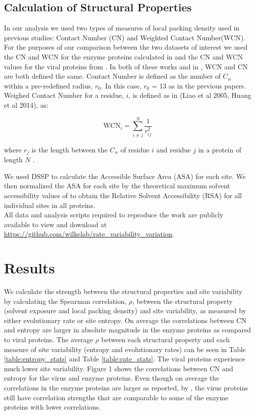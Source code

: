 \documentclass[12pt]{article}
\begin{document}
    \subsection*{Calculation of Structural Properties}
In our analysis we used two types of measures of local packing density used in previous studies: Contact Number (CN) and Weighted Contact Number(WCN). For the purposes of our comparison between the two datasets of interest we used the CN and WCN for the enzyme proteins calculated in \cite{Huangetal2014} and the CN and WCN values for the viral proteins from \cite{Shahmoradietal2014}. In both of these works and in \cite{Yehetal2014}, WCN and CN are both defined the same.  Contact Number is defined as the number of $C_{\alpha}$ within a pre-redefined radius, $r_0$. In this case, $r_0$ = 13 as in the previous papers. Weighed Contact Number for a residue, $i$, is defined as in (Liao et al 2005, Huang et al 2014), as:
	
	\begin{equation} \label{wcn_eqn}
		\text{WCN}_i = \sum_{i \neq j}^{N} \frac{1}{r_{ij}^2 } 
	\end{equation}
	
	where $r_j$ is the length between the $C_{\alpha}$ of residue $i$ and residue $j$ in a protein of length $N$ \citep{Yehetal2014}. 

\indent We used DSSP \citep{Kabschetal2005} to calculate the Accessible Surface Area (ASA) for each site. We then normalized the ASA for each site by the theoretical maximum solvent accessibility values of \cite{Tienetal2013} to obtain the Relative Solvent Accessibility (RSA) for all individual sites in all proteins. \\

All data and analysis scripts required to reproduce the work are publicly available to view and download at \url{https://github.com/wilkelab/rate_variability_variation}.

\section{Results}
\label{sec:results}

We calculate the strength between the structural properties and site variability by calculating the Spearman correlation, $\rho$,  between the structural property (solvent exposure and local packing density) and site variability, as measured by either evolutionary rate or site entropy. On average the correlations between CN and entropy are larger in absolute magnitude in the enzyme proteins as compared to viral proteins. The average $\rho$ between each structural property and each measure of site variability (entropy and evolutionary rates) can be seen in Table \ref{table:entropy_stats}  and Table \ref{table:rate_stats}. The viral proteins experience much lower site variability. Figure 1 shows the correlations between CN and entropy for the virus and enzyme proteins. Even though on average the correlations in the enzyme proteins are larger as reported, by \cite{Yehetal2014}, the virus proteins still have correlation strengths that are comparable to some of the enzyme proteins with lower correlations. 
\end{document}
